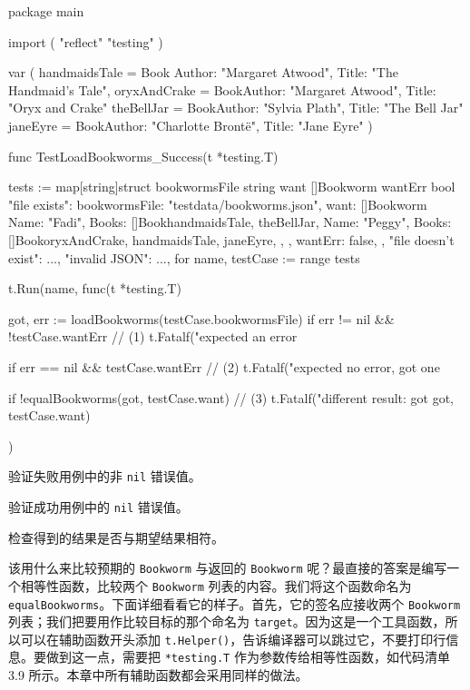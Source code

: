 \begin{gocode}[title={代码清单 3.8 \texttt{bookworms\_internal\_test.go}：测试 \texttt{LoadBookworms()}}]
package main

import (
    "reflect"
    "testing"
)

var (
    handmaidsTale = Book{
        Author: "Margaret Atwood", Title: "The Handmaid's Tale",
    }
    oryxAndCrake = Book{Author: "Margaret Atwood", Title: "Oryx and Crake"}
    theBellJar    = Book{Author: "Sylvia Plath", Title: "The Bell Jar"}
    janeEyre      = Book{Author: "Charlotte Brontë", Title: "Jane Eyre"}
)

func TestLoadBookworms_Success(t *testing.T) {
    tests := map[string]struct {
        bookwormsFile string
        want          []Bookworm
        wantErr       bool
    }{
        "file exists": {
             bookwormsFile: "testdata/bookworms.json",
             want: []Bookworm{
                 {Name: "Fadi", Books: []Book{handmaidsTale, theBellJar}},
                 {Name: "Peggy", Books:
                     []Book{oryxAndCrake, handmaidsTale, janeEyre},
                 },
             },
             wantErr: false,
        },
        "file doesn't exist": {...},
        "invalid JSON": {...},
    }
    for name, testCase := range tests {
        t.Run(name, func(t *testing.T) {
             got, err := loadBookworms(testCase.bookwormsFile)
             if err != nil && !testCase.wantErr { // (1)
                 t.Fatalf("expected an error %
             }

             if err == nil && testCase.wantErr { // (2)
                 t.Fatalf("expected no error, got one %
             }

             if !equalBookworms(got, testCase.want) { // (3)
                 t.Fatalf("different result: got %
                     got, testCase.want)
             }
        })
    }
}
\end{gocode}

\begin{codeannotations}
  \item 验证失败用例中的非 \texttt{nil} 错误值。
  \item 验证成功用例中的 \texttt{nil} 错误值。
  \item 检查得到的结果是否与期望结果相符。
\end{codeannotations}

该用什么来比较预期的 \texttt{Bookworm} 与返回的 \texttt{Bookworm} 呢？最直接的答案是编写一个相等性函数，比较两个 \texttt{Bookworm} 列表的内容。我们将这个函数命名为 \texttt{equalBookworms}。下面详细看看它的样子。首先，它的签名应接收两个 \texttt{Bookworm} 列表；我们把要用作比较目标的那个命名为 \texttt{target}。因为这是一个工具函数，所以可以在辅助函数开头添加 \texttt{t.Helper()}，告诉编译器可以跳过它，不要打印行信息。要做到这一点，需要把 \texttt{*testing.T} 作为参数传给相等性函数，如代码清单 3.9 所示。本章中所有辅助函数都会采用同样的做法。

